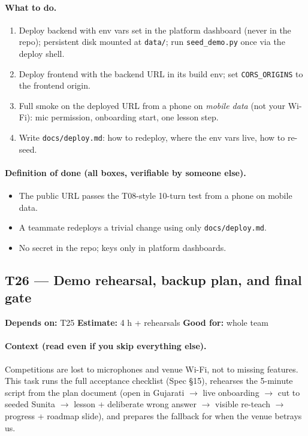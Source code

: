 \documentclass[11pt]{article}
\newcommand{\code}[1]{\texttt{#1}}
\newcommand{\taskmeta}[3]{\noindent\textbf{Depends on:} #1 \quad\textbullet\quad \textbf{Estimate:} #2 \quad\textbullet\quad \textbf{Good for:} #3\par\vspace{2pt}}
\newcommand{\ctx}[1]{\paragraph{Context (read even if you skip everything else).} #1}
\newcommand{\dod}{\paragraph{Definition of done (all boxes, verifiable by someone else).}}
\begin{document}
\paragraph{What to do.}
\begin{enumerate}
  \item Deploy backend with env vars set in the platform dashboard (never in the repo); persistent disk mounted at \code{data/}; run \code{seed\_demo.py} once via the deploy shell.
  \item Deploy frontend with the backend URL in its build env; set \code{CORS\_ORIGINS} to the frontend origin.
  \item Full smoke on the deployed URL from a phone on \emph{mobile data} (not your Wi-Fi): mic permission, onboarding start, one lesson step.
  \item Write \code{docs/deploy.md}: how to redeploy, where the env vars live, how to re-seed.
\end{enumerate}
\dod
\begin{itemize}
  \item The public URL passes the T08-style 10-turn test from a phone on mobile data.
  \item A teammate redeploys a trivial change using only \code{docs/deploy.md}.
  \item No secret in the repo; keys only in platform dashboards.
\end{itemize}

\subsection{T26 --- Demo rehearsal, backup plan, and final gate}
\taskmeta{T25}{4 h + rehearsals}{whole team}
\ctx{Competitions are lost to microphones and venue Wi-Fi, not to missing features. This task runs the full acceptance checklist (Spec \S15), rehearses the 5-minute script from the plan document (open in Gujarati \(\rightarrow\) live onboarding \(\rightarrow\) cut to seeded Sunita \(\rightarrow\) lesson + deliberate wrong answer \(\rightarrow\) visible re-teach \(\rightarrow\) progress + roadmap slide), and prepares the fallback for when the venue betrays us.}
\end{document}
